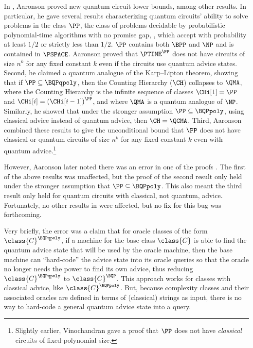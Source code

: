 \documentclass{toc}
\begin{document}
In \cite{aaronson_subtle}, Aaronson proved new quantum circuit lower bounds,
among other results.
In particular, he gave several results characterizing quantum circuits' ability
to solve problems in the class $\PP$,
the class of problems decidable by probabilistic 
%
polynomial-time %
algorithms with no promise gap,
\ie{}, which accept with probability at least $1/2$ or strictly less than $1/2$.
$\PP$ contains both $\BPP$ and $\NP$ and is contained in $\PSPACE$.
Aaronson proved that $\PTIME^\PP$ does not have circuits of size $n^k$ for any
fixed constant $k$ even if the circuits use quantum advice states.
Second, he claimed a quantum analogue of the Karp--Lipton theorem, showing that if
$\PP\subseteq \BQPqpoly$, then the Counting Hierarchy ($\CH$) collapses to $\QMA$,
where the Counting Hierarchy is the infinite sequence of classes $\CHi[1]=\PP$ and
$\CHi[i]=\left(\CHi[i-1]\right)^\PP$,
and where $\QMA$ is a quantum analogue of $\NP$.
Similarly, he showed that under the stronger assumption $\PP \subseteq \BQPpoly$,
using classical advice instead of quantum advice,
then $\CH = \QCMA$.
Third, Aaronson combined these results to give the unconditional bound that $\PP$
does not have classical or quantum circuits of size $n^k$ for
any fixed constant $k$ even with quantum advice.\footnote{Slightly earlier,
	Vinochandran \cite{vinodchandran2005note} gave a proof that $\PP$ does not
	have \emph{classical} circuits of %
	fixed-polynomial size.} %

However, Aaronson later noted there was an error in one of the proofs \cite{aaronsonBlogErrors2017}.
The first of the above results was unaffected,
but the proof of the second result only held under the stronger assumption that
$\PP\subseteq \BQPpoly$.
This also meant the third result only held for quantum circuits with classical,
not quantum, advice.
Fortunately, no other results in \cite{aaronson_subtle} were affected,
but no fix for this bug
was forthcoming.

Very briefly, the error was a claim that for oracle classes of the form
$\class{C}^{\BQPqpoly}$, if a machine for the base class $\class{C}$
is able to find the quantum advice state that will be used by the oracle machine,
then the base machine can ``hard-code'' the advice state into its oracle queries so that
the oracle no longer needs the power to find its own advice,
thus reducing $\class{C}^{\BQPqpoly}$ to $\class{C}^{\BQP}$.
This approach works for classes with classical advice, like $\class{C}^{\BQPpoly}$.
But, because complexity classes and their associated oracles
are defined in terms of (classical) strings as input,
there is no way to hard-code a general quantum advice state into a query.
\end{document}
